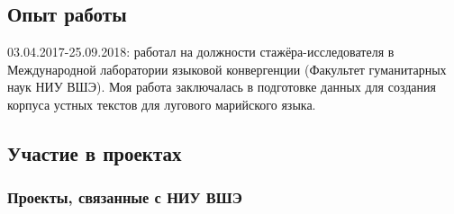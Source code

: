 \documentclass[a4paper,10pt]{article}
\begin{document}
\subsection{Опыт работы}
03.04.2017-25.09.2018: работал на должности стажёра-исследователя в Международной лаборатории языковой конвергенции (Факультет гуманитарных наук НИУ ВШЭ). Моя работа заключалась в подготовке данных для создания корпуса устных текстов для лугового марийского языка.

\subsection{Участие в проектах}

\subsubsection{Проекты, связанные с НИУ ВШЭ}
\end{document}
